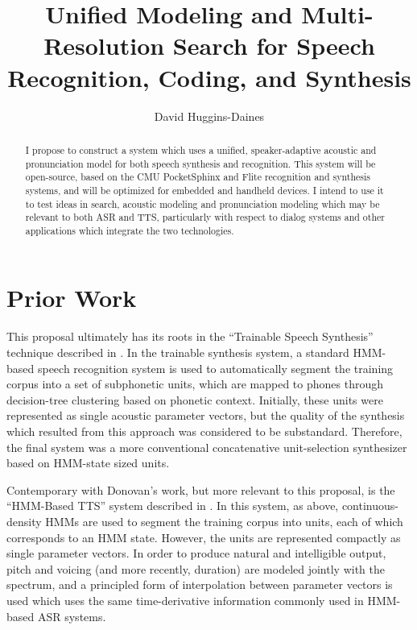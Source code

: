 \documentclass{article}
\title{Unified Modeling and Multi-Resolution Search for Speech
  Recognition, Coding, and Synthesis}
\author{David Huggins-Daines}
\begin{document}
\maketitle

\begin{abstract}
  I propose to construct a system which uses a unified,
  speaker-adaptive acoustic and pronunciation model for both speech
  synthesis and recognition.  This system will be open-source, based
  on the CMU PocketSphinx and Flite recognition and synthesis systems,
  and will be optimized for embedded and handheld devices.  I intend
  to use it to test ideas in search, acoustic modeling and
  pronunciation modeling which may be relevant to both ASR and TTS,
  particularly with respect to dialog systems and other applications
  which integrate the two technologies.
\end{abstract}

\section{Prior Work}
\label{sec:prior}

This proposal ultimately has its roots in the ``Trainable Speech
Synthesis'' technique described in \cite{Donovan1996}.  In the
trainable synthesis system, a standard HMM-based speech recognition
system is used to automatically segment the training corpus into a set
of subphonetic units, which are mapped to phones through decision-tree
clustering based on phonetic context.  Initially, these units were
represented as single acoustic parameter vectors, but the quality of
the synthesis which resulted from this approach was considered to be
substandard.  Therefore, the final system was a more conventional
concatenative unit-selection synthesizer based on HMM-state sized
units.

Contemporary with Donovan's work, but more relevant to this proposal,
is the ``HMM-Based TTS'' system described in \cite{Masuko1996}.  In
this system, as above, continuous-density HMMs are used to segment the
training corpus into units, each of which corresponds to an HMM state.
However, the units are represented compactly as single parameter
vectors.  In order to produce natural and intelligible output, pitch
and voicing (and more recently, duration) are modeled jointly with the
spectrum, and a principled form of interpolation between parameter
vectors is used \cite{Tokuda2000} which uses the same time-derivative
information commonly used in HMM-based ASR systems.
\end{document}
